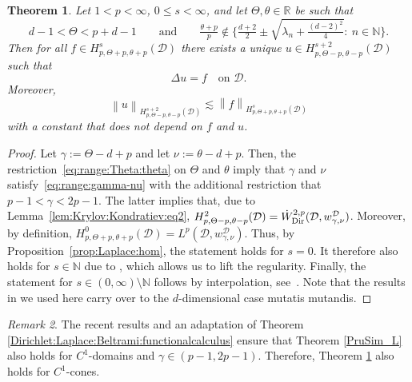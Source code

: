 \documentclass[12pt,a4paper, reqno]{amsart}
\theoremstyle{plain}
\newtheorem{theorem}{Theorem}[section]
\theoremstyle{definition}
\theoremstyle{remark}
\newtheorem{remark}[theorem]{Remark}
\numberwithin{equation}{section}
\newcommand{\1}{\mathbbm{1}}
\newcommand{\R}{\ensuremath{\mathbb{R}}}
\newcommand{\N}{\ensuremath{\mathbb{N}}}
\newcommand{\calD}{\ensuremath{\mathcal{D}}}
\newcommand{\Dir}{\textup{Dir}}
\newcommand{\nrm}[1]{\left\lVert #1 \right\rVert}
\begin{document}
\begin{theorem}\label{thm:Poisson:Krylov}
    Let $1<p<\infty$, $0\leq s< \infty$, and let $\Theta,\theta\in\R$ be such that
    \begin{equation}\label{eq:range:Theta:theta}
    d-1<\Theta<p+d-1\qquad\text{and}\qquad 
    \tfrac{\theta+p}{p}\notin \Big\{ \tfrac{d+2}{2}\pm\sqrt{\lambda_n+\tfrac{(d-2)^2}{4}}: \ n\in\N\Big\}.
\end{equation}
Then for all $f\in H^s_{p,\Theta+p,\theta+p}(\calD)$ there exists a unique $u\in H^{s+2}_{p,\Theta-p,\theta-p}(\calD)$ such that
\begin{equation}\label{eq:PoissonD}
\Delta u = f \quad \text{on } \calD.
\end{equation}
Moreover, 
\begin{equation}\label{eq:a-priori}
\nrm{ u}_{H^{s+2}_{p,\Theta-p, \theta-p}(\calD) } \lesssim \nrm{f}_{H^{s}_{p,\Theta+p, \theta+p}(\calD)}    
\end{equation}
with a constant that does not depend on $f$ and $u$.
\end{theorem}
\begin{proof}
Let $\gamma:=\Theta-d+p$ and let $\nu:=\theta-d+p$. Then, the restriction~\eqref{eq:range:Theta:theta} on $\Theta$ and $\theta$ imply that $\gamma$ and $\nu$ satisfy~\eqref{eq:range:gamma-nu} with the additional restriction that $p-1<\gamma<2p-1$. 
The latter implies that, due to Lemma~\ref{lem:Krylov:Kondratiev:eq2}, $H^2_{p,\Theta-p,\theta-p}(\calD)=\Dot{W}^{2,p}_\Dir(\calD,w_{\gamma,\nu}^\calD)$.
Moreover, by definition, $H^0_{p,\Theta+p,\theta+p}(\calD)=L^p(\calD,w_{\gamma,\nu}^\calD)$. Thus, by Proposition~\ref{prop:Laplace:hom}, the statement holds for $s=0$. It therefore also holds for $s\in\N$ due to \cite[Theorem~4.1(i)]{cioicalicht2024sobolevspacesmixedweights}, which allows us to lift the regularity. Finally, the statement for $s\in (0,\infty)\setminus\N$ follows by interpolation, see~\cite[Theorem~3.11]{cioicalicht2024sobolevspacesmixedweights}. 
Note that the results in \cite{cioicalicht2024sobolevspacesmixedweights} we used here carry over to the $d$-dimensional case mutatis mutandis. 
\end{proof}
\begin{remark}
    The recent results \cite[Theorem 6.2 \& Theorem 6.4]{lindemulder2025functionalcalculusweightedsobolev} and an adaptation of Theorem \ref{Dirichlet:Laplace:Beltrami:functionalcalculus} ensure that Theorem \ref{PruSim_L} also holds for $C^1$-domains and $\gamma\in (p-1,2p-1)$. Therefore, Theorem \ref{thm:Poisson:Krylov} also holds for $C^1$-cones. 
\end{remark}
\end{document}
